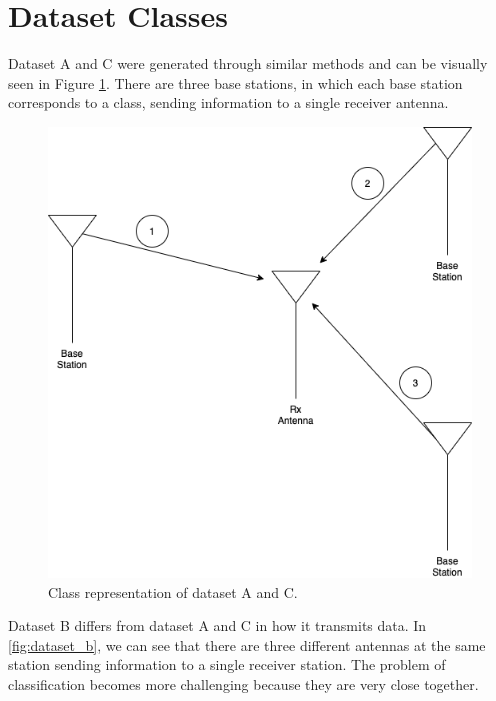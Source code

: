 \documentclass{turabian-thesis}
\begin{document}
\section{Dataset Classes}

Dataset A and C were generated through similar methods and can be visually seen in Figure \ref{fig:dataset_ac}. There are three base stations, in which each base station corresponds to a class, sending information to a single receiver antenna.


\begin{figure}[h!]
   \begin{center}
      \includegraphics[scale=0.4]{../media/dataset_ac.png}
   \end{center}
   \caption{Class representation of dataset A and C.}
   \label{fig:dataset_ac}
\end{figure}

Dataset B differs from dataset A and C in how it transmits data. In \ref{fig:dataset_b}, we can see that there are three different antennas at the same station sending information to a single receiver station. The problem of classification becomes more challenging because they are very close together.
\end{document}
